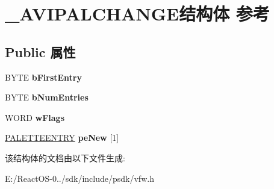 \hypertarget{struct___a_v_i_p_a_l_c_h_a_n_g_e}{}\section{\+\_\+\+A\+V\+I\+P\+A\+L\+C\+H\+A\+N\+G\+E结构体 参考}
\label{struct___a_v_i_p_a_l_c_h_a_n_g_e}
\subsection*{Public 属性}
\begin{DoxyCompactItemize}
\item 
\mbox{\label{struct___a_v_i_p_a_l_c_h_a_n_g_e_ac7c9cea068489089de0ced9e7f2951ba}} 
B\+Y\+TE {\bfseries b\+First\+Entry}
\item 
\mbox{\label{struct___a_v_i_p_a_l_c_h_a_n_g_e_a2b9a9e420aed8f71b5956bc422c94ae3}} 
B\+Y\+TE {\bfseries b\+Num\+Entries}
\item 
\mbox{\label{struct___a_v_i_p_a_l_c_h_a_n_g_e_a8180167080dbdc0f0e6ceb6d3825a807}} 
W\+O\+RD {\bfseries w\+Flags}
\item 
\mbox{\label{struct___a_v_i_p_a_l_c_h_a_n_g_e_a22f0181e16ec357cbde2353143acd291}} 
\hyperlink{structtag_p_a_l_e_t_t_e_e_n_t_r_y}{P\+A\+L\+E\+T\+T\+E\+E\+N\+T\+RY} {\bfseries pe\+New} \mbox{[}1\mbox{]}
\end{DoxyCompactItemize}


该结构体的文档由以下文件生成\+:\begin{DoxyCompactItemize}
\item 
E\+:/\+React\+O\+S-\/0../sdk/include/psdk/vfw.\+h\end{DoxyCompactItemize}
